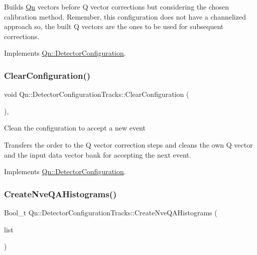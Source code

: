 Builds \mbox{\hyperlink{namespaceQn}{Qn}} vectors before Q vector corrections but considering the chosen calibration method. Remember, this configuration does not have a channelized approach so, the built Q vectors are the ones to be used for subsequent corrections. 

Implements \mbox{\hyperlink{classQn_1_1DetectorConfiguration_a7aaf10f6e30151dd142d59d5dff72e2d}{Qn\+::\+Detector\+Configuration}}.

\mbox{\label{classQn_1_1DetectorConfigurationTracks_aba7ffa70d60483d7e51460e4309b0fb2}} 
\subsubsection{\texorpdfstring{Clear\+Configuration()}{ClearConfiguration()}}
{\footnotesize\ttfamily void Qn\+::\+Detector\+Configuration\+Tracks\+::\+Clear\+Configuration (\begin{DoxyParamCaption}{ }\end{DoxyParamCaption})\hspace{0.3cm}{\ttfamily [inline]}, {\ttfamily [virtual]}}

Clean the configuration to accept a new event

Transfers the order to the Q vector correction steps and cleans the own Q vector and the input data vector bank for accepting the next event. 

Implements \mbox{\hyperlink{classQn_1_1DetectorConfiguration_a94c21b39a4a3680675319aacf4a517f4}{Qn\+::\+Detector\+Configuration}}.

\mbox{\label{classQn_1_1DetectorConfigurationTracks_a34818d88b49d67ae71561ffd71c02ec1}} 
\subsubsection{\texorpdfstring{Create\+Nve\+Q\+A\+Histograms()}{CreateNveQAHistograms()}}
{\footnotesize\ttfamily Bool\+\_\+t Qn\+::\+Detector\+Configuration\+Tracks\+::\+Create\+Nve\+Q\+A\+Histograms (\begin{DoxyParamCaption}\item[{T\+List $\ast$}]{list }\end{DoxyParamCaption})\hspace{0.3cm}{\ttfamily [virtual]}}

